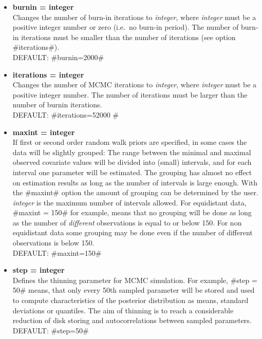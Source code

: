 \begin{itemize}
\item {\bf burnin = integer } \\
Changes the number of burn-in iterations to {\em integer}, where
{\em integer} must be a positive integer number or zero (i.e.~no
burn-in period).
The number of burn-in iterations must be smaller than the number of iterations (see option #iterations#). \\
DEFAULT: #burnin=2000#

\item {\bf iterations = integer } \\
Changes the number of MCMC iterations to {\em integer}, where {\em
integer} must be a positive integer number. The number of
iterations must be larger than the
number of burnin iterations. \\
DEFAULT: #iterations=52000 #


\item {\bf maxint = integer } \\
If first or second order random walk priors are specified, in some
cases the data will be slightly grouped: The range between the
minimal and maximal observed covariate values will be divided into
(small) intervals, and for each interval one parameter will be
estimated. The grouping has almost no effect on estimation results
as long as the number of intervals is large enough. With the
#maxint# option the amount of grouping can be determined by the
user. {\em integer} is the maximum number of intervals allowed.
For equidistant data, #maxint = 150# for example, means that no
grouping will be done as long as the number of {\em different}
observations is equal to or below 150. For non equidistant
data some grouping may be done even if the number of different observations is below 150. \\
DEFAULT: #maxint=150#

\item {\bf step = integer} \\
Defines the thinning parameter for MCMC simulation. For example,
#step = 50# means, that only every 50th sampled parameter will be
stored and used to compute characteristics of the posterior
distribution as means, standard deviations or quantiles. The aim
of thinning is to reach a considerable reduction of disk storing
and autocorrelations between sampled parameters.\\
DEFAULT: #step=50#

\end{itemize}

